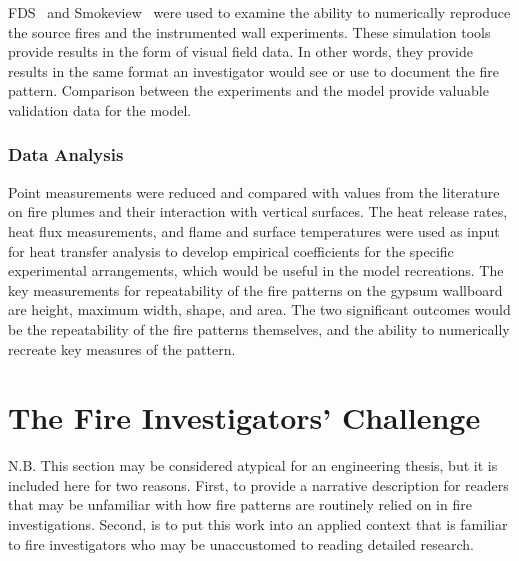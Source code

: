 \documentclass[twoside]{uocthesis}
\begin{document}
{FDS~\cite{FDS_Users_Guide} and Smokeview~\cite{Smokeview_Users_Guide} were used to examine the ability to numerically reproduce the source fires and the instrumented wall experiments. These simulation tools provide results in the form of visual field data.  In other words, they provide results in the same format an investigator would see or use to document the fire pattern.  Comparison between the experiments and the model provide valuable validation data for the model.

\subsubsection{Data Analysis}

Point measurements were reduced and compared with values from the literature on fire plumes and their interaction with vertical surfaces.  The heat release rates, heat flux measurements, and flame and surface temperatures were used as input for heat transfer analysis to develop empirical coefficients for the specific experimental arrangements, which would be useful in the model recreations.
The key measurements for repeatability of the fire patterns on the gypsum wallboard are height, maximum width, shape, and area.  The two significant outcomes would be the repeatability of the fire patterns themselves, and the ability to numerically recreate key measures of the pattern.

\section{The Fire Investigators' Challenge}

N.B. This section may be considered atypical for an engineering thesis, but it is included here for two reasons.  First, to provide a narrative description for readers that may be unfamiliar with how fire patterns are routinely relied on in fire investigations.  Second, is to put this work into an applied context that is familiar to fire investigators who may be unaccustomed to reading detailed research.  

}
\end{document}
